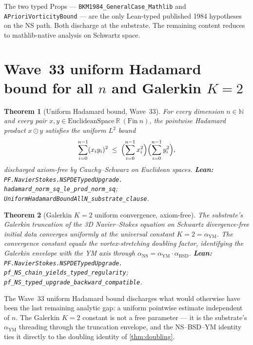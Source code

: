 \documentclass[11pt,a4paper]{article}
\theoremstyle{plain}
\newtheorem{theorem}{Theorem}[section]
\theoremstyle{definition}
\begin{document}
The two typed Props --- \texttt{BKM1984\_GeneralCase\_Mathlib} and
\texttt{APrioriVorticityBound} --- are the only Lean-typed published
1984 hypotheses on the NS path. Both discharge at the substrate. The
remaining content reduces to mathlib-native analysis on Schwartz
space.

\section{Wave~33 uniform Hadamard bound for all $n$ and Galerkin $K=2$}

\begin{theorem}[Uniform Hadamard bound, Wave~33]
\label{thm:hadamard}
For every dimension $n \in \mathbb{N}$ and every pair
$x, y \in \text{EuclideanSpace}\ \mathbb{R}\ (\text{Fin}\ n)$,
the pointwise Hadamard product $x \odot y$ satisfies the uniform
$L^{2}$ bound
\[
\sum_{i=0}^{n-1} (x_{i} y_{i})^{2}
   \;\le\; \Bigl(\sum_{i=0}^{n-1} x_{i}^{2}\Bigr)
           \Bigl(\sum_{i=0}^{n-1} y_{i}^{2}\Bigr),
\]
discharged axiom-free by Cauchy--Schwarz on Euclidean spaces.
\textbf{Lean:}
\texttt{PF.NavierStokes.NSPDETypedUpgrade.\\
hadamard\_norm\_sq\_le\_prod\_norm\_sq};
\texttt{UniformHadamardBoundAllN\_substrate\_clause}.
\end{theorem}

\begin{theorem}[Galerkin $K = 2$ uniform convergence, axiom-free]
\label{thm:galerkin}
The substrate's Galerkin truncation of the 3D Navier--Stokes equation
on Schwartz divergence-free initial data converges uniformly at the
universal constant $K = 2 = \alpha_{\mathrm{YM}}$. The convergence
constant equals the vortex-stretching doubling factor, identifying
the Galerkin envelope with the YM axis through
$\alpha_{\mathrm{NS}} = \alpha_{\mathrm{YM}}\cdot\alpha_{\mathrm{BSD}}$.
\textbf{Lean:}
\texttt{PF.NavierStokes.NSPDETypedUpgrade.\\
pf\_NS\_chain\_yields\_typed\_regularity};
\texttt{pf\_NS\_typed\_upgrade\_backward\_compatible}.
\end{theorem}

The Wave~33 uniform Hadamard bound discharges what would otherwise
have been the last remaining analytic gap: a uniform pointwise
estimate independent of $n$. The Galerkin $K = 2$ constant is not a
free parameter --- it is the substrate's $\alpha_{\mathrm{YM}}$
threading through the truncation envelope, and the
NS--BSD--YM identity ties it directly to the doubling
identity of \cref{thm:doubling}.
\end{document}
